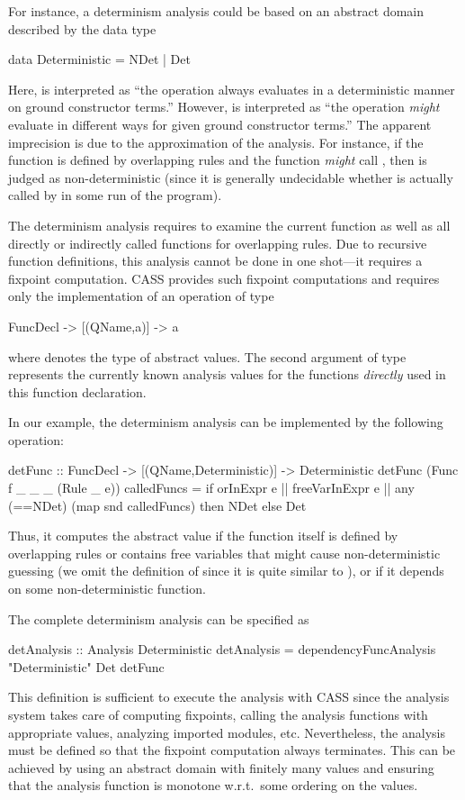For instance, a determinism analysis could be based
on an abstract domain described by the data type
\begin{curry}
data Deterministic = NDet | Det
\end{curry}
Here,  is interpreted as ``the operation always evaluates
in a deterministic manner on ground constructor terms.''
However,  is interpreted as ``the operation \emph{might}
evaluate in different ways for given ground constructor terms.''
The apparent imprecision is due to the approximation of the analysis.
For instance, if the function  is defined by overlapping rules
and the function  \emph{might} call , then 
is judged as non-deterministic (since it is generally undecidable
whether  is actually called by  in some run of the
program).

The determinism analysis requires to examine the current
function as well as all directly or indirectly called functions
for overlapping rules.
Due to recursive function definitions, this analysis cannot be done
in one shot---it requires a fixpoint computation.
CASS provides such fixpoint computations and requires
only the implementation of an operation of type
\begin{curry}
FuncDecl -> [(QName,a)] -> a
\end{curry}
where  denotes the type of abstract values.
The second argument of type \code{[(QName,a)]}
represents the currently known analysis values
for the functions \emph{directly} used in this function declaration.

In our example, the determinism analysis can be implemented
by the following operation:
\begin{curry}
detFunc :: FuncDecl -> [(QName,Deterministic)] -> Deterministic
detFunc (Func f _ _ _ (Rule _ e)) calledFuncs =
  if orInExpr e || freeVarInExpr e || any (==NDet) (map snd calledFuncs)
   then NDet
   else Det
\end{curry}
Thus, it computes the abstract value 
if the function itself is defined by overlapping rules or
contains free variables that might cause non-deterministic guessing
(we omit the definition of  since it is quite
similar to ), or
if it depends on some non-deterministic function.

The complete determinism analysis can be specified as
\begin{curry}
detAnalysis :: Analysis Deterministic
detAnalysis = dependencyFuncAnalysis "Deterministic" Det detFunc
\end{curry}
This definition is sufficient to execute the analysis
with CASS since the analysis system takes care of computing fixpoints,
calling the analysis functions with appropriate values,
analyzing imported modules, etc.
Nevertheless, the analysis must be defined so that the fixpoint
computation always terminates. This can be achieved by using
an abstract domain with finitely many values and ensuring
that the analysis function is monotone w.r.t.\ some ordering on the values.
